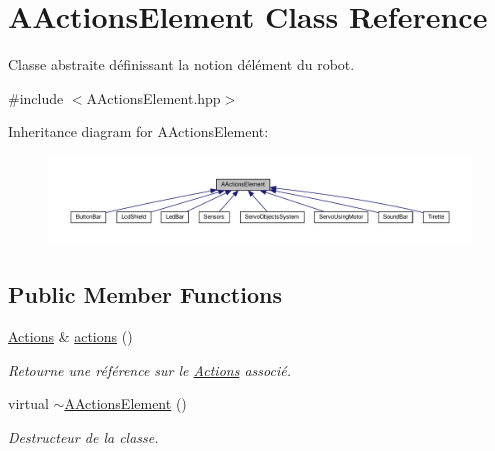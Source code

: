 \hypertarget{classAActionsElement}{}\section{A\+Actions\+Element Class Reference}
\label{classAActionsElement}


Classe abstraite définissant la notion d\textquotesingle{}élément du robot.  




{\ttfamily \#include $<$A\+Actions\+Element.\+hpp$>$}



Inheritance diagram for A\+Actions\+Element\+:
\nopagebreak
\begin{figure}[H]
\begin{center}
\leavevmode
\includegraphics[width=350pt]{classAActionsElement__inherit__graph}
\end{center}
\end{figure}
\subsection*{Public Member Functions}
\begin{DoxyCompactItemize}
\item 
\mbox{\label{classAActionsElement_a3fbd5b8201049a59602d8b7201a9ef8a}} 
\hyperlink{classActions}{Actions} \& \hyperlink{classAActionsElement_a3fbd5b8201049a59602d8b7201a9ef8a}{actions} ()
\begin{DoxyCompactList}\small\item\em Retourne une référence sur le \hyperlink{classActions}{Actions} associé. \end{DoxyCompactList}\item 
\mbox{\label{classAActionsElement_a9baf29a52564a98ebb13c076c8f73a89}} 
virtual \hyperlink{classAActionsElement_a9baf29a52564a98ebb13c076c8f73a89}{$\sim$\+A\+Actions\+Element} ()
\begin{DoxyCompactList}\small\item\em Destructeur de la classe. \end{DoxyCompactList}\end{DoxyCompactItemize}
